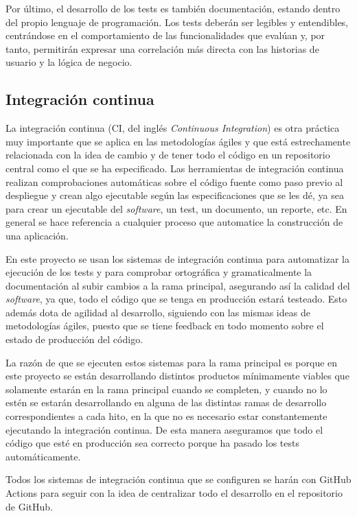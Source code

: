Por último, el desarrollo de los tests es también documentación, estando dentro del propio lenguaje de programación. Los tests deberán ser legibles y entendibles, centrándose en el comportamiento de las funcionalidades que evalúan y, por tanto, permitirán expresar una correlación más directa con las historias de usuario y la lógica de negocio.

\subsection{Integración continua}
La integración continua (CI, del inglés \textit{Continuous Integration}) es otra práctica muy importante que se aplica en las metodologías ágiles y que está estrechamente relacionada con la idea de cambio y de tener todo el código en un repositorio central como el que se ha especificado. Las herramientas de integración continua realizan comprobaciones automáticas sobre el código fuente como paso previo al despliegue y crean algo ejecutable según las especificaciones que se les dé, ya sea para crear un ejecutable del \textit{software}, un test, un documento, un reporte, etc. En general se hace referencia a cualquier proceso que automatice la construcción de una aplicación.

En este proyecto se usan los sistemas de integración continua para automatizar la ejecución de los tests y para comprobar ortográfica y gramaticalmente la documentación al subir cambios a la rama principal, asegurando así la calidad del \textit{software}, ya que, todo el código que se tenga en producción estará testeado. Esto además dota de agilidad al desarrollo, siguiendo con las mismas ideas de metodologías ágiles, puesto que se tiene feedback en todo momento sobre el estado de producción del código.

La razón de que se ejecuten estos sistemas para la rama principal es porque en este proyecto se están desarrollando distintos productos mínimamente viables que solamente estarán en la rama principal cuando se completen, y cuando no lo estén se estarán desarrollando en alguna de las distintas ramas de desarrollo correspondientes a cada hito, en la que no es necesario estar constantemente ejecutando la integración continua. De esta manera aseguramos que todo el código que esté en producción sea correcto porque ha pasado los tests automáticamente.

Todos los sistemas de integración continua que se configuren se harán con GitHub Actions para seguir con la idea de centralizar todo el desarrollo en el repositorio de GitHub.

